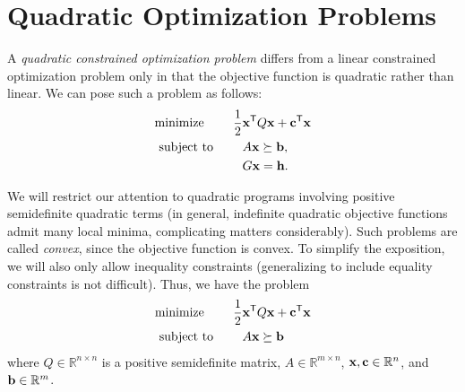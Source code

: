 \def\Mu{\boldsymbol{\mu}}
\def\Lamb{\boldsymbol{\lambda}}



\section*{Quadratic Optimization Problems}
A \emph{quadratic constrained optimization problem} differs from a linear constrained optimization problem only in that the objective function is quadratic rather than linear.
We can pose such a problem as follows:
\begin{align*}
\text{minimize }\qquad \frac{1}{2}&\mathbf{x}^{\mathsf T} Q\mathbf{x} + \mathbf{c}^{\mathsf T} \mathbf{x}\\
\text{subject to }\qquad &A\mathbf{x} \succeq \mathbf{b},\\
&G\mathbf{x} = \mathbf{h}.
\end{align*}

We will restrict our attention to quadratic programs involving positive semidefinite quadratic terms (in general, indefinite quadratic objective functions admit many local minima, complicating matters considerably).
Such problems are called \emph{convex}, since the objective function is convex.
To simplify the exposition, we will also only allow inequality constraints (generalizing to include equality constraints is not difficult).
Thus, we have the problem
\begin{align*}
\text{minimize }\qquad \frac{1}{2}&\mathbf{x}^{\mathsf T} Q\mathbf{x} + \mathbf{c}^{\mathsf T} \mathbf{x}\\
\text{subject to }\qquad &A\mathbf{x} \succeq \mathbf{b}\\
\end{align*}
where $Q\in\mathbb{R}^{n\times n}$ is a positive semidefinite matrix, $A\in\mathbb{R}^{m\times n}$, $\mathbf{x}, \mathbf{c} \in \mathbb{R}^n$,
and $\mathbf{b} \in \mathbb{R}^m$.

